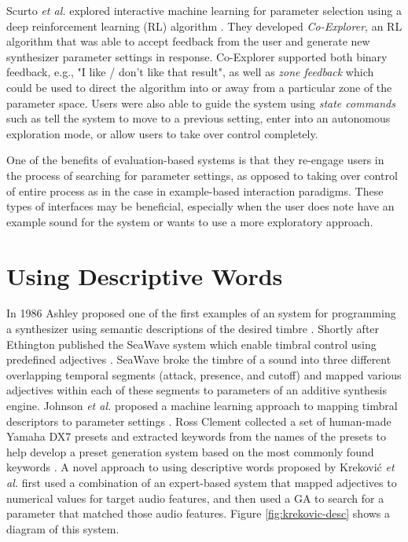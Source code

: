 Scurto \textit{et al.} \cite{scurto2021designing} explored interactive machine learning for parameter selection using a deep reinforcement learning (RL) algorithm \cite{sutton2018reinforcement}. They developed \textit{Co-Explorer}, an RL algorithm that was able to accept feedback from the user and generate new synthesizer parameter settings in response. Co-Explorer supported both binary feedback, e.g., "I like / don't like that result", as well as \textit{zone feedback} which could be used to direct the algorithm into or away from a particular zone of the parameter space. Users were also able to guide the system using \textit{state commands} such as tell the system to move to a previous setting, enter into an autonomous exploration mode, or allow users to take over control completely.

One of the benefits of evaluation-based systems is that they re-engage users in the process of searching for parameter settings, as opposed to taking over control of entire process as in the case in example-based interaction paradigms. These types of interfaces may be beneficial, especially when the user does note have an example sound for the system or wants to use a more exploratory approach.

\section{Using Descriptive Words}\label{section:descriptive-words}
In 1986 Ashley proposed one of the first examples of an system for programming a synthesizer using semantic descriptions of the desired timbre \cite{ashley1986knowledge}. Shortly after Ethington published the SeaWave system which enable timbral control using predefined adjectives \cite{ethington1994seawave}. SeaWave broke the timbre of a sound into three different overlapping temporal segments (attack, presence, and cutoff) and mapped various adjectives within each of these segments to parameters of an additive synthesis engine. Johnson \textit{et al.} proposed a machine learning approach to mapping timbral descriptors to parameter settings \cite{johnson2006timbre}. Ross Clement collected a set of human-made Yamaha DX7 presets and extracted keywords from the names of the presets to help develop a preset generation system based on the most commonly found keywords \cite{clement2011automatic}. A novel approach to using descriptive words proposed by Krekovi\'{c} \textit{et al.} \cite{krekovic2016algorithm} first used a combination of an expert-based system that mapped adjectives to numerical values for target audio features, and then used a GA to search for a parameter that matched those audio features. Figure \ref{fig:krekovic-desc} shows a diagram of this system.

